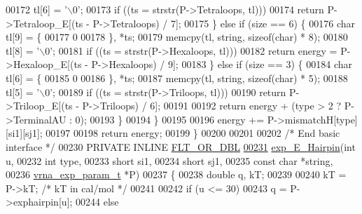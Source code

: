 \begin{DoxyCode}
00172       tl[6] = \textcolor{charliteral}{'\(\backslash\)0'};
00173       \textcolor{keywordflow}{if} ((ts = strstr(P->Tetraloops, tl)))
00174         \textcolor{keywordflow}{return} P->Tetraloop\_E[(ts - P->Tetraloops) / 7];
00175     \} \textcolor{keywordflow}{else} \textcolor{keywordflow}{if} (size == 6) \{
00176       \textcolor{keywordtype}{char} tl[9] = \{
00177         0
00178       \}, *ts;
00179       memcpy(tl, \textcolor{keywordtype}{string}, \textcolor{keyword}{sizeof}(\textcolor{keywordtype}{char}) * 8);
00180       tl[8] = \textcolor{charliteral}{'\(\backslash\)0'};
00181       \textcolor{keywordflow}{if} ((ts = strstr(P->Hexaloops, tl)))
00182         \textcolor{keywordflow}{return} energy = P->Hexaloop\_E[(ts - P->Hexaloops) / 9];
00183     \} \textcolor{keywordflow}{else} \textcolor{keywordflow}{if} (size == 3) \{
00184       \textcolor{keywordtype}{char} tl[6] = \{
00185         0
00186       \}, *ts;
00187       memcpy(tl, \textcolor{keywordtype}{string}, \textcolor{keyword}{sizeof}(\textcolor{keywordtype}{char}) * 5);
00188       tl[5] = \textcolor{charliteral}{'\(\backslash\)0'};
00189       \textcolor{keywordflow}{if} ((ts = strstr(P->Triloops, tl)))
00190         \textcolor{keywordflow}{return} P->Triloop\_E[(ts - P->Triloops) / 6];
00191 
00192       \textcolor{keywordflow}{return} energy + (type > 2 ? P->TerminalAU : 0);
00193     \}
00194   \}
00195 
00196   energy += P->mismatchH[type][si1][sj1];
00197 
00198   \textcolor{keywordflow}{return} energy;
00199 \}
00200 
00201 
00202 \textcolor{comment}{/* End basic interface */}
00230 PRIVATE INLINE \hyperlink{group__data__structures_ga31125aeace516926bf7f251f759b6126}{FLT\_OR\_DBL}
\hyperlink{group__eval__loops__hp_ga51fb555974f180b78d76142b2894851c}{00231} \hyperlink{group__eval__loops__hp_ga51fb555974f180b78d76142b2894851c}{exp\_E\_Hairpin}(\textcolor{keywordtype}{int}               u,
00232               \textcolor{keywordtype}{int}               type,
00233               \textcolor{keywordtype}{short}             si1,
00234               \textcolor{keywordtype}{short}             sj1,
00235               \textcolor{keyword}{const} \textcolor{keywordtype}{char}        *\textcolor{keywordtype}{string},
00236               \hyperlink{group__energy__parameters_structvrna__exp__param__s}{vrna\_exp\_param\_t}  *P)
00237 \{
00238   \textcolor{keywordtype}{double} q, kT;
00239 
00240   kT = P->kT;   \textcolor{comment}{/* kT in cal/mol  */}
00241 
00242   \textcolor{keywordflow}{if} (u <= 30)
00243     q = P->exphairpin[u];
00244   \textcolor{keywordflow}{else}

\end{DoxyCode}
